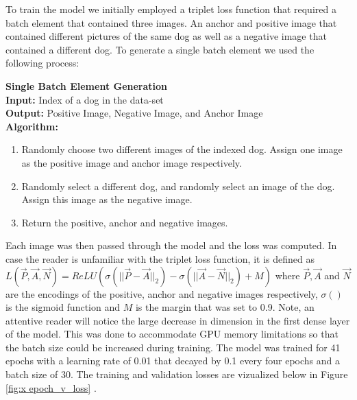 \documentclass{article}
\begin{document}
To train the model we initially employed a triplet loss function that required a batch element that contained three images.  An anchor and positive image that contained different pictures of the same dog as well as a negative image that contained a different dog.  To generate a single batch element we used the following process: \\


    \begin{minipage}{1\textwidth}%
     \noindent \textbf{Single Batch Element Generation}  \\
    
      \noindent \textbf{Input:} Index of a dog in the data-set \\
      
      \noindent \textbf{Output:} Positive Image, Negative Image, and Anchor Image \\
      
      \noindent \textbf{Algorithm:} \\
    \end{minipage}%
    
    \begin{enumerate}
    
      \item Randomly choose two different images of the indexed dog.  Assign one image as the positive image and anchor image respectively. 
    
      \item Randomly select a different dog, and randomly select an image of the dog.  Assign this image as the negative image.
      
      \item Return the positive, anchor and negative images.
    
    \end{enumerate}

Each image was then passed through the model and the loss was computed.  In case the reader is unfamiliar with the triplet loss function,  it is defined as $L(\vec{P}, \vec{A}, \vec{N}) = ReLU(\sigma(||\vec{P}-\vec{A}||_2) - \sigma(||\vec{A}- \vec{N}||_2) + M)$ where $\vec{P}, \vec{A}$ and $\vec{N}$ are the encodings of the positive, anchor and negative images respectively, $\sigma()$ is the sigmoid function and $M$ is the margin that was set to 0.9.  Note, an attentive reader will notice the large decrease in dimension in the first dense layer of the model.  This was done to accommodate GPU memory limitations so that the batch size could be increased during training.   The model was trained for 41 epochs with a learning rate of 0.01 that decayed by 0.1 every four epochs and a batch size of 30.  The training and validation losses are vizualized below in Figure \ref{fig:x epoch_v_loss} .
\end{document}
